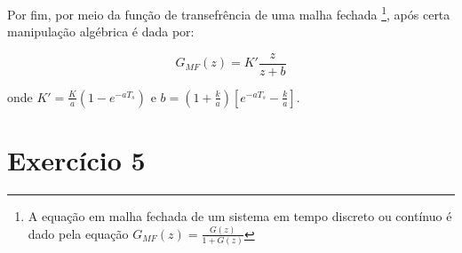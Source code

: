 \documentclass[twoside, fleqn]{article}
\begin{document}
    Por fim, por meio da função de transefrência de uma malha fechada \footnote{A equação em malha fechada de um sistema em tempo discreto ou contínuo é dado pela equação $G_{MF}(z) = \frac{G(z)}{1+G(z)}$}, após certa manipulação algébrica é dada por:
    
        \begin{equation}
            G_{MF}(z) = K' \frac{z}{z+b}
        \end{equation}
        
    onde $K' = \frac{K}{a} (1-e^{-aT_s}) \mbox{ e } b = (1 + \frac{k}{a})\left[e^{-aT_s} - \frac{k}{a} \right] $.

\section*{Exercício 5}
\end{document}
